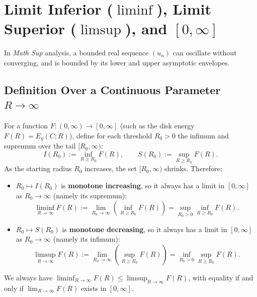 \documentclass[11pt, a4paper]{article}
\theoremstyle{definition}
\theoremstyle{remark}
\begin{document}
\section{Limit Inferior ($\liminf$), Limit Superior ($\limsup$), and $[0, \infty]$}
\label{app:liminf}

In \textit{Math Sup} analysis, a bounded real sequence $(u_n)$ can oscillate without converging, and is bounded by its lower and upper asymptotic envelopes.

\subsection{Definition Over a Continuous Parameter $R \to \infty$}
For a function $F : (0, \infty) \to [0, \infty]$ (such as the disk energy $F(R) = E_g(C; R)$), define for each threshold $R_0 > 0$ the infimum and supremum over the tail $[R_0, \infty)$:
\[
I(R_0) := \inf_{R \ge R_0} F(R), \qquad S(R_0) := \sup_{R \ge R_0} F(R).
\]
As the starting radius $R_0$ increases, the set $[R_0, \infty)$ shrinks. Therefore:
\begin{itemize}
    \item $R_0 \mapsto I(R_0)$ is \textbf{monotone increasing}, so it always has a limit in $[0, \infty]$ as $R_0 \to \infty$ (namely its supremum):
    \[
    \liminf_{R \to \infty} F(R) := \lim_{R_0 \to \infty} \left(\inf_{R \ge R_0} F(R)\right) = \sup_{R_0 > 0} \inf_{R \ge R_0} F(R).
    \]
    \item $R_0 \mapsto S(R_0)$ is \textbf{monotone decreasing}, so it always has a limit in $[0, \infty]$ as $R_0 \to \infty$ (namely its infimum):
    \[
    \limsup_{R \to \infty} F(R) := \lim_{R_0 \to \infty} \left(\sup_{R \ge R_0} F(R)\right) = \inf_{R_0 > 0} \sup_{R \ge R_0} F(R).
    \]
\end{itemize}
We always have $\liminf_{R \to \infty} F(R) \le \limsup_{R \to \infty} F(R)$, with equality if and only if $\lim_{R \to \infty} F(R)$ exists in $[0, \infty]$.
\end{document}
